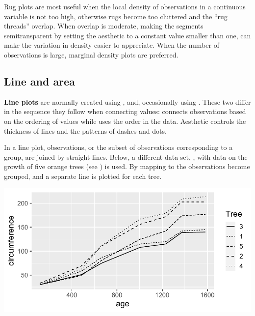 \documentclass[krantz2]{krantz}\usepackage{knitr}
\begin{document}
\begin{warningbox}
  Rug plots are most useful when the local density of observations in a continuous variable is not too high, otherwise rugs become too cluttered and the ``rug threads'' overlap. When overlap is moderate, making the segments semitransparent by setting the  aesthetic to a constant value smaller than one, can make the variation in density easier to appreciate. When the number of observations is large, marginal density plots are preferred.
\end{warningbox}

\subsection{Line and area}\label{sec:plot:line}

\textbf{Line plots} are normally created using , and, occasionally using . These two  differ in the sequence they follow when connecting values:  connects observations based on the ordering of  values while  uses the order in the data. Aesthetic  controls the thickness of lines and  the patterns of dashes and dots.

In a line plot, observations, or the subset of observations corresponding to a group, are joined by straight lines. Below, a different data set, , with data on the growth of five orange trees (see ) is used. By mapping  to  the observations become grouped, and a separate line is plotted for each tree.

\label{plot:fig:lines}
\begin{knitrout}\footnotesize
{}\color{fgcolor}\begin{kframe}
\begin{alltt}
\hlstd{(} 
        \hlstd{=} \hlstd{(}      \hlopt{+}
  \hlstd{()}
\end{alltt}
\end{kframe}

{\centering \includegraphics[width=.7\textwidth]{figure/pos-line-plot-01-1} 

}


\end{knitrout}
\end{document}
